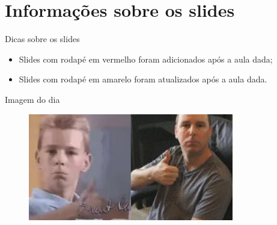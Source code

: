 \documentclass{beamer}
\begin{document}
\section{Informações sobre os slides}

\begin{frame}[fragile]{Dicas sobre os slides}
      
      \begin{itemize}
            \item Slides com rodapé em vermelho foram adicionados após a aula dada;
            \item Slides com rodapé em amarelo foram atualizados  após a aula dada.
      \end{itemize}
\end{frame}

\begin{frame}[fragile]{Imagem do dia}

        \begin{figure}[H]
            \centerline{\includegraphics[width=0.8\textwidth]{assets/imagem-do-dia/brent_rambo.jpg}}
            
        \end{figure}
\end{frame}


\footlinecolor{}

\backmatter
\end{document}

